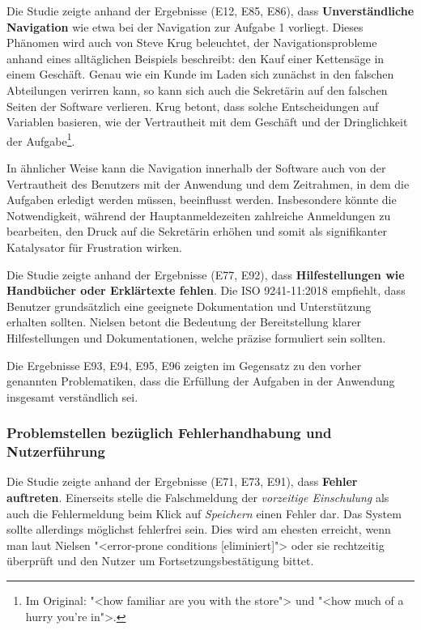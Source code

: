 Die Studie zeigte anhand der Ergebnisse (E12, E85, E86), dass \textbf{Unverständliche Navigation} wie etwa bei der Navigation zur Aufgabe 1 vorliegt. Dieses Phänomen wird auch von Steve Krug beleuchtet, der Navigationsprobleme anhand eines alltäglichen Beispiels beschreibt: den Kauf einer Kettensäge in einem Geschäft. Genau wie ein Kunde im Laden sich zunächst in den falschen Abteilungen verirren kann, so kann sich auch die Sekretärin auf den falschen Seiten der Software verlieren. Krug betont, dass solche Entscheidungen auf Variablen basieren, wie der Vertrautheit mit dem Geschäft und der Dringlichkeit der Aufgabe\footnote{Im Original: "<how familiar are you with the store"> und "<how much of a hurry you're in">.}.\cite{krug}

In ähnlicher Weise kann die Navigation innerhalb der Software auch von der Vertrautheit des Benutzers mit der Anwendung und dem Zeitrahmen, in dem die Aufgaben erledigt werden müssen, beeinflusst werden. Insbesondere könnte die Notwendigkeit, während der Hauptanmeldezeiten zahlreiche Anmeldungen zu bearbeiten, den Druck auf die Sekretärin erhöhen und somit als signifikanter Katalysator für Frustration wirken.

Die Studie zeigte anhand der Ergebnisse (E77, E92), dass \textbf{Hilfestellungen wie Handbücher oder Erklärtexte fehlen}. Die ISO 9241-11:2018 empfiehlt, dass Benutzer grundsätzlich eine geeignete Dokumentation und Unterstützung erhalten sollten.\cite{ISO9241-11} Nielsen betont die Bedeutung der Bereitstellung klarer Hilfestellungen und Dokumentationen, welche präzise formuliert sein sollten.\cite{Nielsen10}

Die Ergebnisse E93, E94, E95, E96 zeigten im Gegensatz zu den vorher genannten Problematiken, dass die Erfüllung der Aufgaben in der Anwendung insgesamt verständlich sei.

\subsubsection{Problemstellen bezüglich Fehlerhandhabung und Nutzerführung}
Die Studie zeigte anhand der Ergebnisse (E71, E73, E91), dass \textbf{Fehler auftreten}. Einerseits stelle die Falschmeldung der \textit{vorzeitige Einschulung} als auch die Fehlermeldung beim Klick auf \textit{Speichern} einen Fehler dar. Das System sollte allerdings möglichst fehlerfrei sein. Dies wird am ehesten erreicht, wenn man laut Nielsen "<error-prone conditions [eliminiert]"> oder sie rechtzeitig überprüft und den Nutzer um Fortsetzungsbestätigung bittet. \cite{Nielsen10} 


